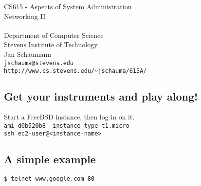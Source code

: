 \documentclass[xga]{xdvislides}
\begin{document}
\setfontphv

\lhead{\slidetitle}                               %
\cfoot{\relax}                               %
\rfoot{\Gray{\today}}

\vspace*{\fill}
\begin{center}
	\Hugesize
		CS615 - Aspects of System Administration\\ [1em]
		Networking II\\ [1em]
	\hspace*{5mm}\blueline\\ [1em]
	\Normalsize
		Department of Computer Science\\
		Stevens Institute of Technology\\
		Jan Schaumann\\
		\verb+jschauma@stevens.edu+\\
		\verb+http://www.cs.stevens.edu/~jschauma/615A/+
\end{center}
\vspace*{\fill}

\subsection{Get your instruments and play along!}

\Hugesize
\vspace*{\fill}
Start a FreeBSD instance, then log in on it. \\

{\tt ami-d0b520b8 --instance-type t1.micro} \\

{\tt ssh ec2-user@<instance-name>}
\vspace*{\fill}
\Normalsize

\subsection{A simple example}
\Hugesize
\begin{center}
\begin{verbatim}
$ telnet www.google.com 80

\end{verbatim}
\end{center}
\Normalsize
\vspace*{\fill}
\end{document}
